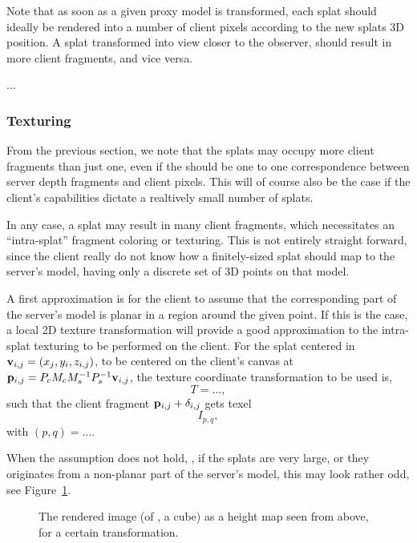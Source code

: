 Note that as soon as a given proxy model is transformed, each splat should
ideally be rendered into a number of client pixels according to the new splats
3D position. A splat transformed into view closer to the observer, should result
in more client fragments, and vice versa. 

...



\subsubsection{Texturing}

From the previous section, we note that the splats may occupy more client
fragments than just one, even if the should be one to one correspondence between
server depth fragments and client pixels. This will of course also be the case
if the client's capabilities dictate a realtively small number of splats.

In any case, a splat may result in many client fragments, which necessitates an
``intra-splat'' fragment coloring or texturing. This is not entirely straight
forward, since the client really do not know how a finitely-sized splat should
map to the server's model, having only a discrete set of 3D points on that
model.

A first approximation is for the client to assume that the corresponding part of
the server's model is planar in a region around the given point. If this is the
case, a local 2D texture transformation will provide a good approximation to the
intra-splat texturing to be performed on the client. For the splat centered in
$\mathbf{v}_{i, j} = (x_j, y_i, z_{i, j})$, to be centered on the client's canvas at
$\mathbf{p}_{i, j} = P_c M_c M_s^{-1} P_s^{-1}\mathbf{v}_{i, j}$, the texture coordinate
transformation to be used is,
\[
  T = \ldots,
\]
such that the client fragment $\mathbf{p}_{i, j} + \delta_{i, j}$ gets texel
\[
  I_{p, q},
\]
with $(p, q) = \ldots$.

When the assumption does not hold, \eg, if the splats are very large, or they
originates from a non-planar part of the server's model, this may look rather
odd, see Figure~\ref{fig:LargeSplatsOnCorners}.

\begin{figure}[htb]
  \centering
  \caption{\label{fig:LargeSplatsOnCorners}
           The rendered image (of \eg, a cube) as a height map seen from above,
           for a certain transformation.}
\end{figure}

